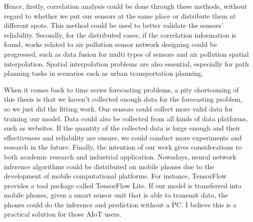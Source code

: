 Hence, firstly, correlation analysis could be done through these methods, without regard to whether we put our sensors at the same place or distribute them at different spots. This method could be used to better validate the sensors' reliability. Secondly, for the distributed cases, if the correlation information is found, works related to air pollution sensor network designing could be progressed, such as data fusion for multi types of sensors and air pollution spatial interpolation. Spatial interpolation problems are also essential, especially for path planning tasks in scenarios such as urban transportation planning.

When it comes back to time series forecasting problems, a pity shortcoming of this thesis is that we haven't collected enough data for the forecasting problem, so we just did the fitting work. Our sensors could collect more valid data for training our model. Data could also be collected from all kinds of data platforms, such as websites. If the quantity of the collected data is large enough and their effectiveness and reliability are ensure, we could conduct more experiments and research in the future.
Finally, the intention of our work gives considerations to both academic research and industrial application. Nowadays, neural network inference algorithms could be distributed on mobile phones due to the development of mobile computational platforms. For instance, TensorFlow provides a tool package called TensorFlow Lite. If our model is transferred into mobile phones, given a smart sensor unit that is able to transmit data, the phones could do the inference and prediction without a PC. I believe this is a practical solution for those AIoT users.
